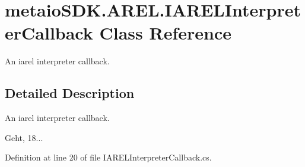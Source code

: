 \section{metaio\-S\-D\-K.\-A\-R\-E\-L.\-I\-A\-R\-E\-L\-Interpreter\-Callback Class Reference}
\label{classmetaio_s_d_k_1_1_a_r_e_l_1_1_i_a_r_e_l_interpreter_callback}


An iarel interpreter callback.  




\subsection{Detailed Description}
An iarel interpreter callback. 

Geht, 18... 

Definition at line 20 of file I\-A\-R\-E\-L\-Interpreter\-Callback.\-cs.

